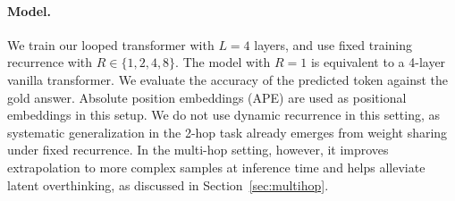 \documentclass{article} %
\newcommand{\yy}[1]{\textcolor{blue}{[Yuekun: #1]}}
\newcommand{\hk}[1]{\textcolor{blue}{[Harsh: #1]}}
\begin{document}
\paragraph{Model.} We train our looped transformer with $L=4$ layers, and use fixed training recurrence with $R \in \{1, 2, 4, 8\}$.
The model with $R=1$ is equivalent to a 4-layer vanilla transformer. 
We evaluate the accuracy of the predicted token against the gold answer.
Absolute position embeddings (APE) \citep{NIPS2017_3f5ee243} are used as positional embeddings in this setup. We do not use dynamic recurrence in this setting, as systematic generalization in the 2-hop task already emerges from weight sharing under fixed recurrence. In the multi-hop setting, however, it improves extrapolation to more complex samples at inference time and helps alleviate latent overthinking, as discussed in Section~\ref{sec:multihop}.

\end{document}
